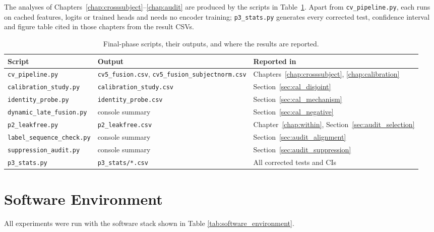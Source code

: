The analyses of Chapters~\ref{chap:crosssubject}--\ref{chap:audit} are produced by the scripts in Table~\ref{tab:p3_scripts}. Apart from \texttt{cv\_pipeline.py}, each runs on cached features, logits or trained heads and needs no encoder training; \texttt{p3\_stats.py} generates every corrected test, confidence interval and figure table cited in those chapters from the result CSVs.

\begin{table}[htbp]
\centering
\small
\caption{Final-phase scripts, their outputs, and where the results are reported.}
\label{tab:p3_scripts}
\begin{tabular}{p{3.9cm} p{5.0cm} p{4.6cm}}
\hline
\textbf{Script} & \textbf{Output} & \textbf{Reported in} \\
\hline
\texttt{cv\_pipeline.py} & \texttt{cv5\_fusion.csv}, \texttt{cv5\_fusion\_subjectnorm.csv} & Chapters~\ref{chap:crosssubject}, \ref{chap:calibration} \\
\texttt{calibration\_study.py} & \texttt{calibration\_study.csv} & Section~\ref{sec:cal_disjoint} \\
\texttt{identity\_probe.py} & \texttt{identity\_probe.csv} & Section~\ref{sec:cal_mechanism} \\
\texttt{dynamic\_late\_fusion.py} & console summary & Section~\ref{sec:cal_negative} \\
\texttt{p2\_leakfree.py} & \texttt{p2\_leakfree.csv} & Chapter~\ref{chap:within}, Section~\ref{sec:audit_selection} \\
\texttt{label\_sequence\_check.py} & console summary & Section~\ref{sec:audit_alignment} \\
\texttt{suppression\_audit.py} & console summary & Section~\ref{sec:audit_suppression} \\
\texttt{p3\_stats.py} & \texttt{p3\_stats/*.csv} & All corrected tests and CIs \\
\hline
\end{tabular}
\end{table}

\section{Software Environment}
All experiments were run with the software stack shown in Table \ref{tab:software_environment}.

